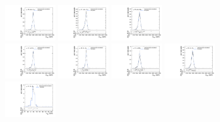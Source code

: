 \begin{figure}[htpb]
  \includegraphics[width=0.2\textwidth]{fig/2Dfit/templateVsReco_VBFRadToWW2000_r0_MVV_mu_LP_nobb_LDy_linear.pdf}
  \includegraphics[width=0.2\textwidth]{fig/2Dfit/templateVsReco_VBFRadToWW2000_r0_MVV_mu_HP_nobb_HDy_linear.pdf}
  \includegraphics[width=0.2\textwidth]{fig/2Dfit/templateVsReco_VBFRadToWW2000_r0_MVV_mu_LP_nobb_HDy_linear.pdf}\\
  \includegraphics[width=0.2\textwidth]{fig/2Dfit/templateVsReco_VBFRadToWW2000_r0_MVV_mu_HP_vbf_LDy_linear.pdf}
  \includegraphics[width=0.2\textwidth]{fig/2Dfit/templateVsReco_VBFRadToWW2000_r0_MVV_mu_LP_vbf_LDy_linear.pdf}
  \includegraphics[width=0.2\textwidth]{fig/2Dfit/templateVsReco_VBFRadToWW2000_r0_MVV_mu_HP_vbf_HDy_linear.pdf}
  \includegraphics[width=0.2\textwidth]{fig/2Dfit/templateVsReco_VBFRadToWW2000_r0_MVV_mu_LP_vbf_HDy_linear.pdf}\\
  \includegraphics[width=0.2\textwidth]{fig/2Dfit/templateVsReco_VBFRadToWW2000_r0_MJ_mu_HP_bb_LDy.pdf}

\end{figure}
